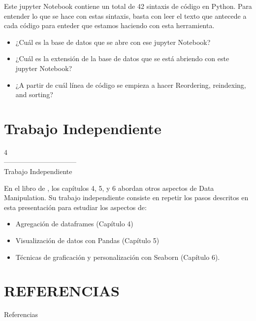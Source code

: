 \documentclass[aspectratio=169]{beamer}
\begin{document}
\begin{frame}
Este jupyter Notebook contiene un total de 42 sintaxis de código en Python. Para entender lo que se hace con estas sintaxis, basta con leer el texto que antecede a cada código para enteder que estamos haciendo con esta herramienta.\\
\vspace{0.3cm}
\begin{itemize}
\item ¿Cuál es la base de datos que se abre con ese jupyter Notebook?
\item ¿Cuál es la extensión de la base de datos que se está abriendo con este jupyter Notebook?
\item ¿A partir de cuál línea de código se empieza a hacer Reordering, reindexing, and sorting?
\end{itemize}
\end{frame}

\section{Trabajo Independiente}

\begin{frame}
\begin{center}
\Huge
\textcolor{azulcesaclaro}{4\\
--------------------------------\\
Trabajo Independiente}
\end{center}
\end{frame}

\begin{frame}
En el libro de \citeauthor{Molin2021} \citeyear{Molin2021}, los capítulos 4, 5, y 6 abordan otros aspectos de Data Manipulation. Su trabajo independiente consiste en repetir los pasos descritos en esta presentación para estudiar los aspectos de:\\
\vspace{0.3cm}
\begin{itemize}
\item Agregación de dataframes (Capítulo 4)
\item Visualización de datos con Pandas (Capítulo 5)
\item Técnicas de graficación y personalización con Seaborn (Capítulo 6).
\end{itemize}
\end{frame}



\section*{REFERENCIAS}
\begin{frame}[allowframebreaks]{Referencias}
\tiny{ 


} 
\end{frame}
\end{document}
